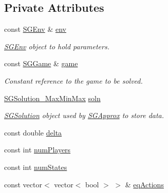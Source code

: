 \subsection*{Private Attributes}
\begin{DoxyCompactItemize}
\item 
\mbox{\label{classSGSolver__MaxMinMax_ac9845908149a8f166fb9b078bb0bdc80}} 
const \hyperlink{classSGEnv}{S\+G\+Env} \& \hyperlink{classSGSolver__MaxMinMax_ac9845908149a8f166fb9b078bb0bdc80}{env}
\begin{DoxyCompactList}\small\item\em \hyperlink{classSGEnv}{S\+G\+Env} object to hold parameters. \end{DoxyCompactList}\item 
\mbox{\label{classSGSolver__MaxMinMax_a39a710babdb8e7579bdb7239d4ed6a1c}} 
const \hyperlink{classSGGame}{S\+G\+Game} \& \hyperlink{classSGSolver__MaxMinMax_a39a710babdb8e7579bdb7239d4ed6a1c}{game}
\begin{DoxyCompactList}\small\item\em Constant reference to the game to be solved. \end{DoxyCompactList}\item 
\mbox{\label{classSGSolver__MaxMinMax_a3cdf8e6950ef52995d0d9290f8b4dc5b}} 
\hyperlink{classSGSolution__MaxMinMax}{S\+G\+Solution\+\_\+\+Max\+Min\+Max} \hyperlink{classSGSolver__MaxMinMax_a3cdf8e6950ef52995d0d9290f8b4dc5b}{soln}
\begin{DoxyCompactList}\small\item\em \hyperlink{classSGSolution}{S\+G\+Solution} object used by \hyperlink{classSGApprox}{S\+G\+Approx} to store data. \end{DoxyCompactList}\item 
const double \hyperlink{classSGSolver__MaxMinMax_a1ad819a8544d528f4d05877a451c8567}{delta}
\item 
const int \hyperlink{classSGSolver__MaxMinMax_a457fae4e376e1f21636629196495fa97}{num\+Players}
\item 
const int \hyperlink{classSGSolver__MaxMinMax_a13cbb5552061a0e1705cbfb7c53ab963}{num\+States}
\item 
const vector$<$ vector$<$ bool $>$ $>$ \& \hyperlink{classSGSolver__MaxMinMax_af7be1bbda2cf8271fffe8135109e0518}{eq\+Actions}
\item 

\end{DoxyCompactItemize}
